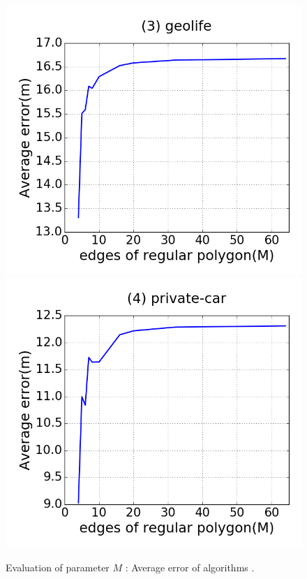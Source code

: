 \begin{figure}[tb!]
\includegraphics[scale = 0.24]{figures/Exp-M-error-geolife.png}
\includegraphics[scale = 0.24]{figures/Exp-M-error-private.png}
\vspace{-2ex}
\caption{\small Evaluation of parameter $M$ : Average error of algorithms \cista.}
\label{fig:m-error-cista}
\vspace{-1ex}
\end{figure}


